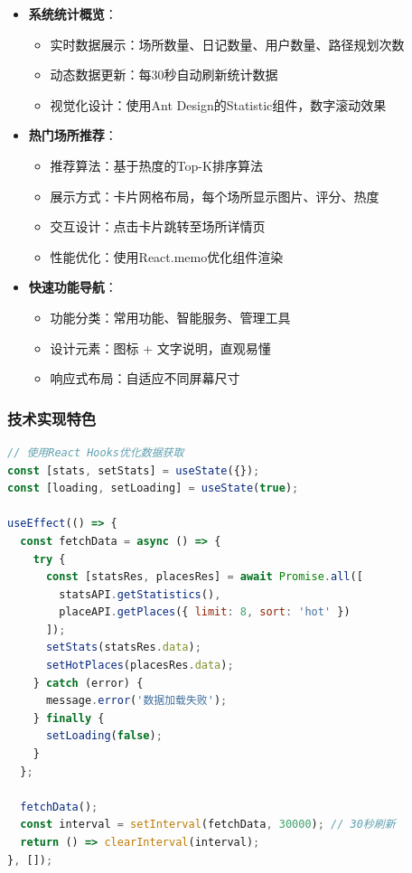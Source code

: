 \documentclass[12pt,a4paper]{article}
\begin{document}
\begin{itemize}
    \item \textbf{系统统计概览}：
    \begin{itemize}
        \item 实时数据展示：场所数量、日记数量、用户数量、路径规划次数
        \item 动态数据更新：每30秒自动刷新统计数据
        \item 视觉化设计：使用Ant Design的Statistic组件，数字滚动效果
    \end{itemize}
    
    \item \textbf{热门场所推荐}：
    \begin{itemize}
        \item 推荐算法：基于热度的Top-K排序算法
        \item 展示方式：卡片网格布局，每个场所显示图片、评分、热度
        \item 交互设计：点击卡片跳转至场所详情页
        \item 性能优化：使用React.memo优化组件渲染
    \end{itemize}
    
    \item \textbf{快速功能导航}：
    \begin{itemize}
        \item 功能分类：常用功能、智能服务、管理工具
        \item 设计元素：图标 + 文字说明，直观易懂
        \item 响应式布局：自适应不同屏幕尺寸
    \end{itemize}
\end{itemize}

\subsubsection{技术实现特色}

\begin{lstlisting}[language=JavaScript, caption={首页数据获取优化}]
// 使用React Hooks优化数据获取
const [stats, setStats] = useState({});
const [loading, setLoading] = useState(true);

useEffect(() => {
  const fetchData = async () => {
    try {
      const [statsRes, placesRes] = await Promise.all([
        statsAPI.getStatistics(),
        placeAPI.getPlaces({ limit: 8, sort: 'hot' })
      ]);
      setStats(statsRes.data);
      setHotPlaces(placesRes.data);
    } catch (error) {
      message.error('数据加载失败');
    } finally {
      setLoading(false);
    }
  };
  
  fetchData();
  const interval = setInterval(fetchData, 30000); // 30秒刷新
  return () => clearInterval(interval);
}, []);
\end{lstlisting}
\end{document}
